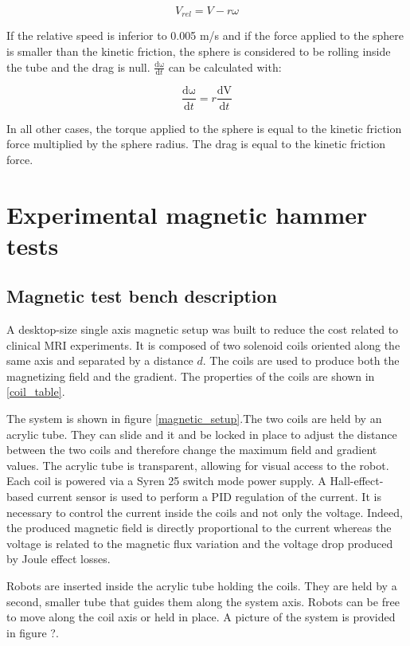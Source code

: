 \documentclass[letterpaper, 10 pt, conference]{ieeeconf}  %
\begin{document}
\begin{equation}
V_{rel}=V-r\omega
\label{relV}
\end{equation}

 
If the relative speed is inferior to 0.005 m/s and if the force applied to the sphere is smaller than the kinetic friction, the sphere is considered to be rolling inside the tube and the drag is null. $\frac{\mathrm{d\omega } }{\mathrm{d} t}$ can be calculated with:

\begin{equation}
\frac{\mathrm{d\omega } }{\mathrm{d} t}=r\frac{\mathrm{dV } }{\mathrm{d} t}
\label{domega}
\end{equation}

In all other cases, the torque applied to the sphere is equal to the kinetic friction force multiplied by the sphere radius. The drag is equal to the kinetic friction force.


\section{Experimental magnetic hammer tests}

\subsection{Magnetic test bench description}

A desktop-size single axis magnetic setup was built to reduce the cost related to clinical MRI experiments. It is composed of two solenoid coils oriented along the same axis and separated by a distance $d$. The coils are used to produce both the magnetizing field and the gradient. The properties of the coils are shown in \cref{coil_table}.\par
The system is shown in figure \cref{magnetic_setup}.The two coils are held by an acrylic tube. They can slide and it and be locked in place to adjust the distance between the two coils and therefore change the maximum field and gradient values. The acrylic tube is transparent, allowing for visual access to the robot.
Each coil is powered via a Syren 25 switch mode power supply. A Hall-effect-based current sensor is used to perform a PID regulation of the current. It is necessary to control the current inside the coils and not only the voltage. Indeed, the produced magnetic field is directly proportional to the current whereas the voltage is related to the magnetic flux variation and the voltage drop produced by Joule effect losses.\par
Robots are inserted inside the acrylic tube holding the coils. They are held by a second, smaller tube that guides them along the system axis. Robots can be free to move along the coil axis or held in place. A picture of the system is provided in figure ?.
\end{document}
